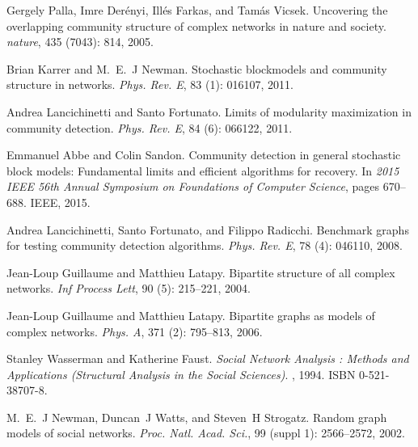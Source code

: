 Gergely Palla, Imre Der{\'e}nyi, Ill{\'e}s Farkas, and Tam{\'a}s Vicsek.
\newblock Uncovering the overlapping community structure of complex networks in
nature and society.
\newblock \emph{nature}, 435 (7043): 814, 2005.

Brian Karrer and M.~E.~J Newman.
\newblock Stochastic blockmodels and community structure in networks.
\newblock \emph{Phys. Rev. E}, 83 (1): 016107, 2011.

Andrea Lancichinetti and Santo Fortunato.
\newblock Limits of modularity maximization in community detection.
\newblock \emph{Phys. Rev. E}, 84 (6): 066122, 2011.

Emmanuel Abbe and Colin Sandon.
\newblock Community detection in general stochastic block models:
{{Fundamental}} limits and efficient algorithms for recovery.
\newblock In \emph{2015 {{IEEE}} 56th Annual Symposium on Foundations of
    Computer Science}, pages 670--688. {IEEE}, 2015.

Andrea Lancichinetti, Santo Fortunato, and Filippo Radicchi.
\newblock Benchmark graphs for testing community detection algorithms.
\newblock \emph{Phys. Rev. E}, 78 (4): 046110, 2008.

Jean-Loup Guillaume and Matthieu Latapy.
\newblock Bipartite structure of all complex networks.
\newblock \emph{Inf Process Lett}, 90 (5): 215--221, 2004.

Jean-Loup Guillaume and Matthieu Latapy.
\newblock Bipartite graphs as models of complex networks.
\newblock \emph{Phys. A}, 371 (2): 795--813, 2006.

Stanley Wasserman and Katherine Faust.
\newblock \emph{Social Network Analysis : {{Methods}} and Applications
    (Structural Analysis in the Social Sciences)}.
, 1994.
\newblock ISBN 0-521-38707-8.

M.~E.~J Newman, Duncan~J Watts, and Steven~H Strogatz.
\newblock Random graph models of social networks.
\newblock \emph{Proc. Natl. Acad. Sci.}, 99 (suppl 1):
2566--2572, 2002.

